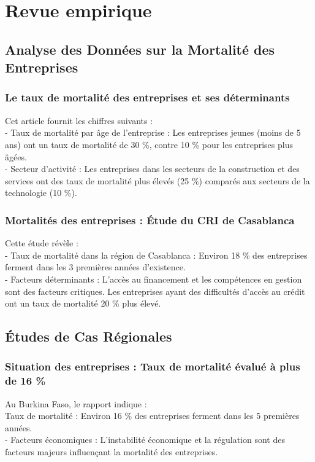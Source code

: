 \documentclass[a4paper,12pt]{report}
\begin{document}
\section{Revue empirique}
\subsection{Analyse des Données sur la Mortalité des Entreprises}
\subsubsection{Le taux de mortalité des entreprises et ses déterminants}
Cet article fournit les chiffres suivants : \\
- Taux de mortalité par âge de l’entreprise : Les entreprises jeunes (moins de 5 ans) ont un taux de mortalité de 30 \%, contre 10 \% pour les entreprises plus âgées. \\
 - Secteur d’activité : Les entreprises dans les secteurs de la construction et des services ont des taux de mortalité plus élevés (25 \%) comparés aux secteurs de la technologie (10 \%).
\subsubsection{Mortalités des entreprises : Étude du CRI de Casablanca}
Cette étude révèle : \\
- Taux de mortalité dans la région de Casablanca : Environ 18 \% des entreprises ferment dans les 3 premières années d’existence. \\
- Facteurs déterminants : L’accès au financement et les compétences en gestion sont des facteurs critiques. Les entreprises ayant des difficultés d’accès au crédit ont un taux de mortalité 20 \% plus élevé. \\
\subsection{Études de Cas Régionales}
\subsubsection{Situation des entreprises : Taux de mortalité évalué à plus de 16 \%} 
Au Burkina Faso, le rapport indique :\\
  Taux de mortalité : Environ 16 \% des entreprises ferment dans les 5 premières années. \\
 
  - Facteurs économiques : L’instabilité économique et la régulation sont des facteurs majeurs influençant la mortalité des entreprises.
\end{document}
